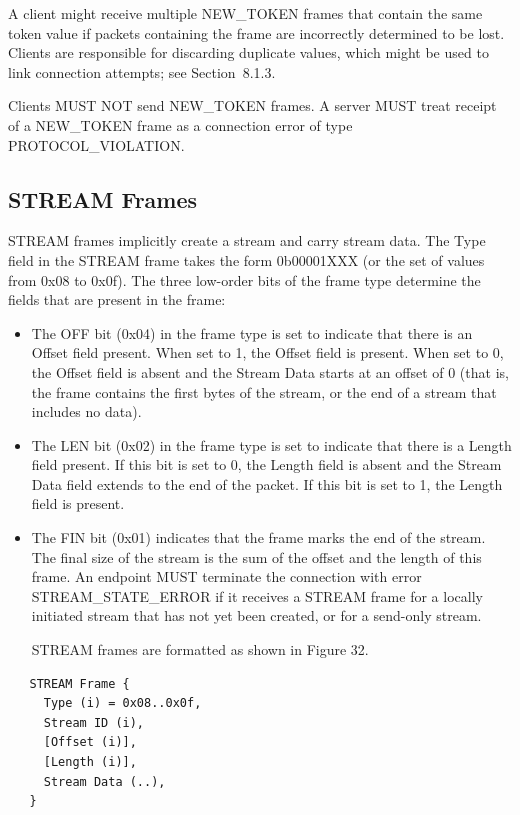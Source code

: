 \documentclass{article}
\begin{document}
A client might receive multiple NEW\_TOKEN frames that contain the same token value if packets containing the frame are incorrectly determined to be lost.  Clients are responsible for discarding duplicate values, which might be used to link connection attempts; see Section~8.1.3.

Clients MUST NOT send NEW\_TOKEN frames.  A server MUST treat receipt of a NEW\_TOKEN frame as a connection error of type PROTOCOL\_VIOLATION.

\subsection{STREAM Frames}

STREAM frames implicitly create a stream and carry stream data.  The Type field in the STREAM frame takes the form 0b00001XXX (or the set of values from 0x08 to 0x0f).  The three low-order bits of the frame type determine the fields that are present in the frame:

\begin{itemize}
\item The OFF bit (0x04) in the frame type is set to indicate that there is an Offset field present.  When set to 1, the Offset field is present.  When set to 0, the Offset field is absent and the Stream Data starts at an offset of 0 (that is, the frame contains the first bytes of the stream, or the end of a stream that includes no data).
\item The LEN bit (0x02) in the frame type is set to indicate that there is a Length field present.  If this bit is set to 0, the Length field is absent and the Stream Data field extends to the end of the packet.  If this bit is set to 1, the Length field is present.
\item The FIN bit (0x01) indicates that the frame marks the end of the stream.  The final size of the stream is the sum of the offset and the length of this frame.
An endpoint MUST terminate the connection with error STREAM\_STATE\_ERROR if it receives a STREAM frame for a locally initiated stream that has not yet been created, or for a send-only stream.

STREAM frames are formatted as shown in Figure 32.

\end{itemize}
\begin{verbatim}
   STREAM Frame {
     Type (i) = 0x08..0x0f,
     Stream ID (i),
     [Offset (i)],
     [Length (i)],
     Stream Data (..),
   }
\end{verbatim}
\end{document}
